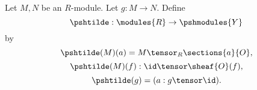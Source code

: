 \begin{definition}
Let $M,N$ be an $R$-module.
Let $g:M \rightarrow N$.
Define 
\[\pshtilde: \modules{R} \rightarrow \pshmodules{Y}\]
by
\[\pshtilde(M)(a) = M \tensor_R \sections{a}{O} ,\]
\[\pshtilde(M)(f): \id \tensor \sheaf{O}(f) ,\]
\[\pshtilde(g) = (a: g \tensor \id ).\]
\end{definition}